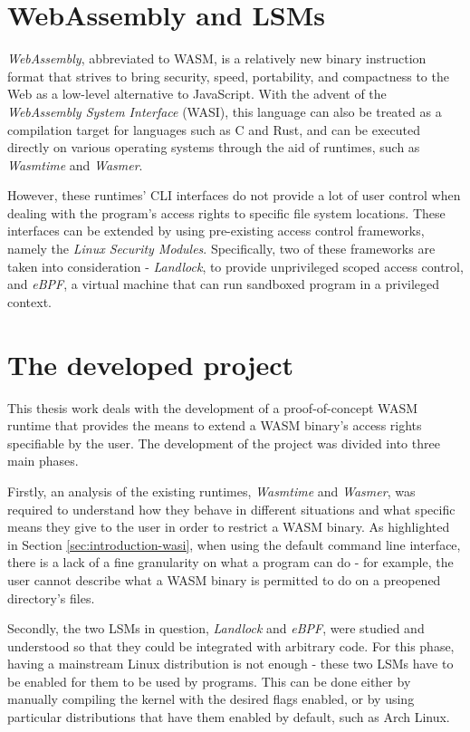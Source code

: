 \section{WebAssembly and LSMs}

\textit{WebAssembly}, abbreviated to WASM, is a relatively new binary instruction format that
strives to bring security, speed, portability, and compactness to the Web
as a low-level alternative to JavaScript.
With the advent of the \textit{WebAssembly System Interface} (WASI),
this language can also be treated as a compilation target for languages such as C and Rust,
and can be executed directly on various operating systems
through the aid of runtimes, such as \textit{Wasmtime} and \textit{Wasmer}.

However, these runtimes' CLI interfaces do not provide a lot of user control
when dealing with the program's access rights to specific file system locations.
These interfaces can be extended by using pre-existing access control frameworks,
namely the \textit{Linux Security Modules}.
Specifically, two of these frameworks are taken into consideration - \textit{Landlock},
to provide unprivileged scoped access control, and \textit{eBPF}, a virtual
machine that can run sandboxed program in a privileged context.

\section{The developed project}

This thesis work deals with the development of a proof-of-concept WASM runtime that
provides the means to extend a WASM binary's access rights specifiable by the user.
The development of the project was divided into three main phases.

Firstly, an analysis of the existing runtimes, \textit{Wasmtime} and \textit{Wasmer},
was required to understand how they behave in different situations and what
specific means they give to the user in order to restrict a WASM binary.
As highlighted in Section \ref{sec:introduction-wasi}, when using the default command line
interface, there is a lack of a fine granularity on what a program can do - for example,
the user cannot describe what a WASM binary is permitted to do on a preopened directory's files.

Secondly, the two LSMs in question, \textit{Landlock} and \textit{eBPF}, were studied and understood
so that they could be integrated with arbitrary code.
For this phase, having a mainstream Linux distribution is not enough - these two LSMs have to be enabled
for them to be used by programs. This can be done either by manually compiling the kernel with the desired
flags enabled, or by using particular distributions that have them enabled by default, such as Arch Linux.


